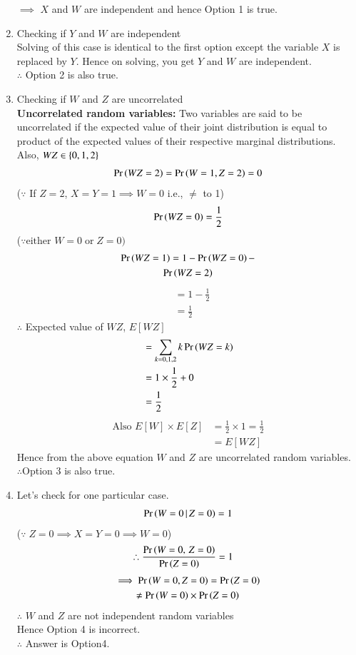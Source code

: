 \documentclass[journal,12pt,twocolumn]{IEEEtran}
\begin{document}
\begin{enumerate}
$\implies$ $X$ and $W$ are independent and hence Option 1 is true.
\item Checking if $Y$ and $W$ are independent\\
Solving of this case is identical to the first option except the variable $X$ is replaced by $Y$.
Hence on solving, you get $Y$  and $W$ are independent.\\
$\therefore$ Option 2 is also true.
\item Checking if $W$ and $Z$ are uncorrelated\\
\textbf{Uncorrelated random variables:} Two variables are said to be uncorrelated if the expected value of their joint distribution is equal to product of the expected values of their respective marginal distributions.\\
Also, $WZ \in\left\{0,1,2\right\}$
\begin{align}
    \Pr\left(WZ =2\right) = \Pr\left(W=1,Z=2\right) =0
\end{align}
($\because$ If $Z=2$, $X = Y =1 \implies W =0$ i.e., $\neq$ to 1)
\begin{align}
    \Pr\left(WZ =0\right) = \frac{1}{2}
\end{align}
($\because\text{either }W=0\;\text{or}\;Z =0)$
\begin{multline}
    \Pr\left(WZ=1\right) = 1 - \Pr\left(WZ =0\right) - \\\Pr\left(WZ =2\right)
\end{multline}
\begin{align}
    &= 1 -\frac{1}{2}\\
    &= \frac{1}{2}
\end{align}
$\therefore$ Expected value of $WZ$, $E[WZ]$
\begin{align}
    &= \sum_{k=0,1,2} k\Pr\left(WZ =k\right)\\
    &= 1 \times \frac{1}{2} +0\\
    &= \frac{1}{2}
\end{align}
\begin{align}
    \text{Also } E[W]\times E[Z] &= \frac{1}{2}\times1 = \frac{1}{2}\\
                                 &= E[WZ]
\end{align}
Hence from the above equation $W$ and $Z$ are uncorrelated random variables.\\
$\therefore$Option 3 is also true.
\item Let's check for one particular case.
\begin{align}
    \Pr\left(W=0\,|\,Z=0\right) = 1
\end{align}
($\because\;Z=0 \implies X = Y =0 \implies W=0$)
\begin{align}
    \therefore \frac{\Pr\left(W=0,\,Z=0\right)}{\Pr\left(Z=0\right)} &= 1
\end{align}
\begin{multline}
   \implies\Pr\left(W=0,Z=0\right) =\Pr\left(Z=0\right) \\
                       \neq\Pr\left(W=0\right)\times\Pr\left(Z=0\right)   
\end{multline}
$\therefore$ $W$ and $Z$ are not independent random variables\\
Hence Option 4 is incorrect.\\
$\therefore$ Answer is Option4.
    
\end{enumerate}
 
\end{document}

